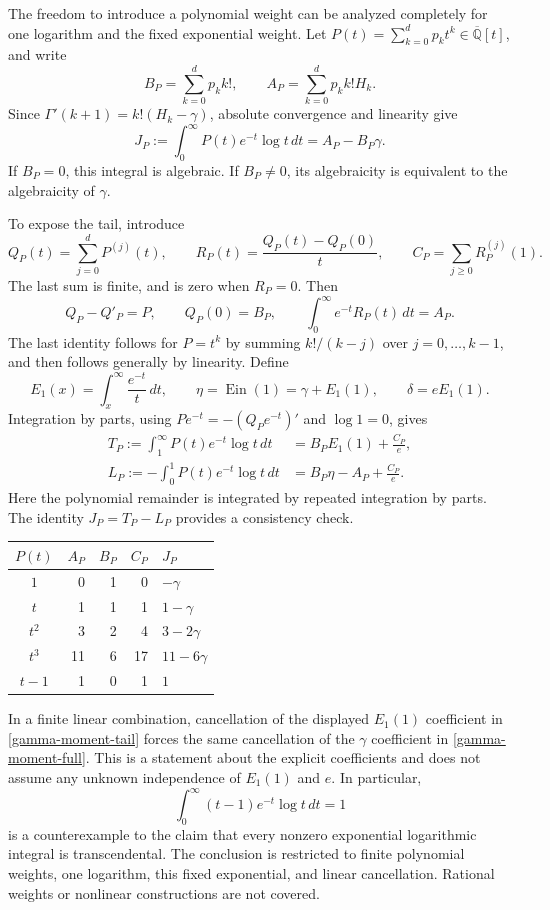 \documentclass[11pt,a4paper]{article}
\theoremstyle{definition}
\theoremstyle{remark}
\numberwithin{equation}{section}
\begin{document}
The freedom to introduce a polynomial weight can be analyzed completely
for one logarithm and the fixed exponential weight. Let
$P(t)=\sum_{k=0}^dp_kt^k\in\overline{\mathbb Q}[t]$, and write
\[
 B_P=\sum_{k=0}^dp_kk!,\qquad
 A_P=\sum_{k=0}^dp_kk!H_k.
\]
Since $\Gamma'(k+1)=k!(H_k-\gamma)$, absolute convergence and linearity
give
\begin{equation}
 J_P:=\int_0^\infty P(t)e^{-t}\log t\,dt=A_P-B_P\gamma.
 \label{gamma-moment-full}
\end{equation}
If $B_P=0$, this integral is algebraic. If $B_P\ne0$, its algebraicity
is equivalent to the algebraicity of $\gamma$.

To expose the tail, introduce
\[
 Q_P(t)=\sum_{j=0}^dP^{(j)}(t),\qquad
 R_P(t)=\frac{Q_P(t)-Q_P(0)}t,
 \qquad C_P=\sum_{j\ge0}R_P^{(j)}(1).
\]
The last sum is finite, and is zero when $R_P=0$.
Then
\[
 Q_P-Q'_P=P,\qquad Q_P(0)=B_P,
 \qquad\int_0^\infty e^{-t}R_P(t)\,dt=A_P.
\]
The last identity follows for $P=t^k$ by summing $k!/(k-j)$ over
$j=0,\ldots,k-1$, and then follows generally by linearity.
Define
\[
 E_1(x)=\int_x^\infty\frac{e^{-t}}t\,dt,\qquad
 \eta=\operatorname{Ein}(1)=\gamma+E_1(1),
 \qquad\delta=eE_1(1).
\]
Integration by parts, using
$Pe^{-t}=-(Q_Pe^{-t})'$ and $\log1=0$, gives
\begin{align}
 T_P:=\int_1^\infty P(t)e^{-t}\log t\,dt
 &=B_PE_1(1)+\frac{C_P}{e},\label{gamma-moment-tail}\\
 L_P:=-\int_0^1P(t)e^{-t}\log t\,dt
 &=B_P\eta-A_P+\frac{C_P}{e}.
 \label{gamma-moment-finite}
\end{align}
Here the polynomial remainder is integrated by repeated integration by
parts. The identity $J_P=T_P-L_P$ provides a consistency check.

\begin{center}
\begin{tabular}{crrrl}
\toprule
$P(t)$&$A_P$&$B_P$&$C_P$&$J_P$\\
\midrule
$1$&0&1&0&$-\gamma$\\
$t$&1&1&1&$1-\gamma$\\
$t^2$&3&2&4&$3-2\gamma$\\
$t^3$&11&6&17&$11-6\gamma$\\
$t-1$&1&0&1&$1$\\
\bottomrule
\end{tabular}
\end{center}

In a finite linear combination, cancellation of the displayed
$E_1(1)$ coefficient in \eqref{gamma-moment-tail} forces the same
cancellation of the $\gamma$ coefficient in
\eqref{gamma-moment-full}. This is a statement about the explicit
coefficients and does not assume any unknown independence of $E_1(1)$
and $e$. In particular,
\[
 \int_0^\infty(t-1)e^{-t}\log t\,dt=1
\]
is a counterexample to the claim that every nonzero exponential
logarithmic integral is transcendental. The conclusion is restricted
to finite polynomial weights, one logarithm, this fixed exponential,
and linear cancellation. Rational weights or nonlinear constructions
are not covered.
\end{document}
